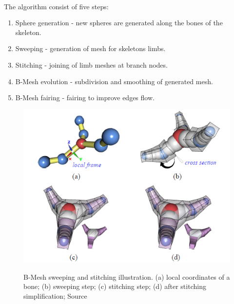 \paragraph{}
The algorithm consist of five steps:
\begin{enumerate}
	\itemsep-0.25em 
	\item Sphere generation - new spheres are generated along the bones of the skeleton.
	\item Sweeping - generation of mesh for skeletons limbs.
	\item Stitching - joining of limb meshes at branch nodes.
	\item B-Mesh evolution - subdivision and smoothing of generated mesh.
	\item B-Mesh fairing - fairing to improve edges flow.
\end{enumerate}
\begin{figure}[h]
    \centering
    \includegraphics{images/b_mesh_ilu.png}
    \label{fig:b_mesh_stitch}
    \caption[B-Mesh sweeping and stitching illustration]{B-Mesh sweeping and stitching illustration. (a) local coordinates of a bone; (b) sweeping step; (c) stitching step; (d) after stitching simplification; Source \cite{ji_bm}}
\end{figure}

